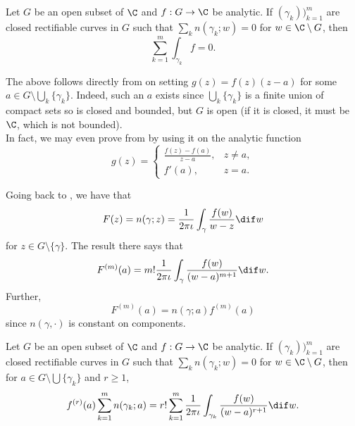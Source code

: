 		\begin{fcor}
			\label{cauchys theorem v1}
			Let $G$ be an open subset of $\C$ and $f : G \to \C$ be analytic. If $(\gamma_k))_{k=1}^m$ are closed rectifiable curves in $G$ such that $\sum_k n(\gamma_k;w) = 0$ for $w \in \C \setminus G$, then
			\[ \sum_{k=1}^m \int_{\gamma_k} f = 0. \]
		\end{fcor}

		The above follows directly from  on setting $g(z) = f(z) (z-a)$ for some $a \in G \setminus \bigcup_k \{\gamma_k\}$. Indeed, such an $a$ exists since $\bigcup_k \{\gamma_k\}$ is a finite union of compact sets so is closed and bounded, but $G$ is open (if it is closed, it must be $\C$, which is not bounded).\\
		In fact, we may even prove  from  by using it on the analytic function
		\[
			g(z) =
			\begin{cases}
				\frac{f(z)-f(a)}{z-a}, & z \ne a, \\
				f'(a), & z = a.
			\end{cases}
		\]

		Going back to , we have that
		\[ F(z) = n(\gamma;z) = \frac{1}{2\pi\iota} \int_\gamma \frac{f(w)}{w-z} \dif w \]
		for $z \in G \setminus \{\gamma\}$. The result there says that
		\[ F^{(m)}(a) = m! \frac{1}{2\pi\iota} \int_\gamma \frac{f(w)}{(w-a)^{m+1}} \dif w. \]
		Further,
		\[ F^{(m)}(a) = n(\gamma;a) f^{(m)}(a) \]
		since $n(\gamma,\cdot)$ is constant on components.

		\begin{theorem}
			Let $G$ be an open subset of $\C$ and $f : G \to \C$ be analytic. If $(\gamma_k))_{k=1}^m$ are closed rectifiable curves in $G$ such that $\sum_k n(\gamma_k;w) = 0$ for $w \in \C \setminus G$, then for $a \in G \setminus \bigcup \{\gamma_k\}$ and $r \ge 1$,
			\[ f^{(r)}(a) \sum_{k=1}^m n(\gamma_k;a) = r! \sum_{k=1}^m \frac{1}{2\pi\iota} \int_{\gamma_k} \frac{f(w)}{(w-a)^{r+1}} \dif w. \]
		\end{theorem}

